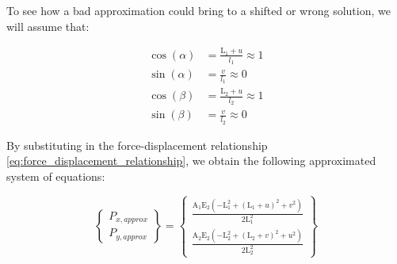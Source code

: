 To see how a bad approximation could bring to a shifted or wrong solution, we will assume that:

\begin{align}
    \cos(\alpha) & = \frac{\text{L}_1+u}{l_1} \approx 1 \\
    \sin(\alpha) & = \frac{v}{l_1} \approx 0            \\
    \cos(\beta)  & = \frac{\text{L}_2+u}{l_2} \approx 1 \\
    \sin(\beta)  & = \frac{v}{l_2} \approx 0
    \label{eq:trigonometric_approximation_hard}
\end{align}

By substituting in the force-displacement relationship \ref{eq:force_displacement_relationship}, we obtain the following approximated system of equations:

\begin{equation}
    \begin{Bmatrix}
        P_{x,approx} \\
        P_{y,approx}
    \end{Bmatrix}
    =
    \begin{Bmatrix}
        \frac{\text{A}_1 \text{E}_2 \left(-\text{L}_1^2+(\text{L}_1+u)^2+v^2\right)}{2 \text{L}_1^2} \\
        \frac{\text{A}_2 \text{E}_2 \left(-\text{L}_2^2+(\text{L}_2+v)^2+u^2\right)}{2 \text{L}_2^2}
    \end{Bmatrix}
    \label{eq:force_displacement_relationship_approximation_hard}
\end{equation}